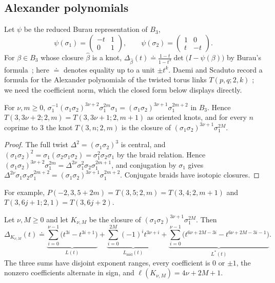 \subsection{Alexander polynomials}\label{ss:twisted-alex}
Let $\psi$ be the reduced Burau representation of $B_3$,
\[
\psi(\sigma_1)=\begin{pmatrix}-t&1\\0&1\end{pmatrix},\qquad
\psi(\sigma_2)=\begin{pmatrix}1&0\\t&-t\end{pmatrix}.
\]
For $\beta\in B_3$ whose closure $\hat\beta$ is a knot,
$\Delta_{\hat\beta}(t)\doteq\frac{1-t}{1-t^3}\det\bigl(I-\psi(\beta)\bigr)$ by Burau's formula~\cite[Thm.~3.11]{Birman}; here $\doteq$ denotes equality up
to a unit $\pm t^k$. Daemi and Scaduto record a formula for the Alexander polynomials of the twisted torus
links $T(p,q;2,k)$ \cite[Prop.~8.32]{DS24}; we need the coefficient norm, which the closed form below displays directly.

\begin{lemma}\label{lem:conj}
For $\nu,m\ge0$, $\sigma_1^{-1}(\sigma_1\sigma_2)^{3\nu+2}\sigma_1^{2m}\sigma_1=(\sigma_1\sigma_2)^{3\nu+1}\sigma_1^{2m+2}$ in
$B_3$. Hence $T(3,3\nu+2;2,m)=T(3,3\nu+1;2,m+1)$ as oriented knots, and for every $n$ coprime to $3$ the knot
$T(3,n;2,m)$ is the closure of $(\sigma_1\sigma_2)^{3\nu+1}\sigma_1^{2M}$.
\end{lemma}

\begin{proof}
The full twist $\Delta^2=(\sigma_1\sigma_2)^3$ is central, and
$(\sigma_1\sigma_2)^2=\sigma_1(\sigma_2\sigma_1\sigma_2)=\sigma_1^2\sigma_2\sigma_1$ by the braid relation. Hence
$(\sigma_1\sigma_2)^{3\nu+2}\sigma_1^{2m}=\Delta^{2\nu}\sigma_1^2\sigma_2\sigma_1^{2m+1}$, and conjugation by $\sigma_1$ gives
$\Delta^{2\nu}\sigma_1\sigma_2\sigma_1^{2m+2}=(\sigma_1\sigma_2)^{3\nu+1}\sigma_1^{2m+2}$. Conjugate braids have isotopic closures.
\end{proof}

For example, $P(-2,3,5+2m)=T(3,5;2,m)=T(3,4;2,m+1)$ and $T(3,6j+1;2,1)=T(3,6j+2)$.

\begin{proposition}\label{prop:twisted-alex}
Let $\nu,M\ge0$ and let $K_{\nu,M}$ be the closure of $(\sigma_1\sigma_2)^{3\nu+1}\sigma_1^{2M}$. Then
\[
\Delta_{K_{\nu,M}}(t)\doteq\underbrace{\sum_{i=0}^{\nu-1}\bigl(t^{3i}-t^{3i+1}\bigr)}_{L(t)}
+\underbrace{\sum_{i=0}^{2M}(-1)^it^{3\nu+i}}_{L_{\mathrm{mid}}(t)}
+\underbrace{\sum_{i=0}^{\nu-1}\bigl(t^{6\nu+2M-3i}-t^{6\nu+2M-3i-1}\bigr)}_{L^*(t)} .
\]
The three sums have disjoint exponent ranges, every coefficient is $0$ or $\pm1$, the nonzero coefficients
alternate in sign, and $\ell(K_{\nu,M})=4\nu+2M+1$.
\end{proposition}

